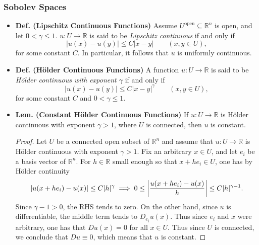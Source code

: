 \documentclass{article}
\begin{document}
	\subsubsection{Sobolev Spaces}
	\begin{itemize}
		\item \textbf{Def. (Lipschitz Continuous Functions)} Assume $U^{\text{open}} \subseteq \mathbb{R}^{n}$ is open, and let $0 < \gamma \leq 1$. $u: U \to \mathbb{R}$ is said to be \textit{Lipschitz continuous} if and only if  
		\begin{equation*}
			|u(x) - u(y)| \leq C|x -y| \qquad (x, y \in U), 
		\end{equation*}
		for some constant $C$. In particular, it follows that $u$ is uniformly continuous. 
		
		\item \textbf{Def. (H\"older Continuous Functions)} A function $u: U \to \mathbb{R}$ is said to be \textit{H\"older continuous with exponent $\gamma$} if and only if 
		\begin{equation*}
			|u(x) - u(y)| \leq C|x - y|^{\gamma} \qquad (x, y \in U), 
		\end{equation*}
		for some constant $C$ and $0 < \gamma \leq 1$. 
		
		\item \textbf{Lem. (Constant H\"older Continuous Functions)} If $u: U \to\mathbb{R}$ is H\"older continuous with exponent $\gamma > 1$, where $U$ is connected, then $u$ is constant. 
		
		\begin{proof}
			Let $U$ be a connected open subset of $\mathbb{R}^{n}$ and assume that $u: U \to \mathbb{R}$ is H\"older continuous with exponent $\gamma > 1$. Fix an arbitrary $x \in U$, and let $e_{i}$ be a basis vector of $\mathbb{R}^{n}$. For $h \in \mathbb{R}$ small enough so that $x + he_{i} \in U$, one has by H\"older continuity
			\begin{equation*}
				|u(x + he_{i}) - u(x)| \leq C|h|^{\gamma} \implies 0 \leq \left| \frac{u(x + he_{i}) - u(x)}{h} \right| \leq C|h|^{\gamma - 1}. 
			\end{equation*}
			Since $\gamma-1 > 0$, the RHS tends to zero. On the other hand, since $u$ is differentiable, the middle term tends to $D_{e_{i}}u(x)$. Thus since $e_{i}$ and $x$ were arbitrary, one has that $Du(x) = 0$ for all $x \in U$. Thus since $U$ is connected, we conclude that $Du \equiv 0$, which means that $u$ is constant.  
		\end{proof}
		

\end{itemize}
\end{document}
